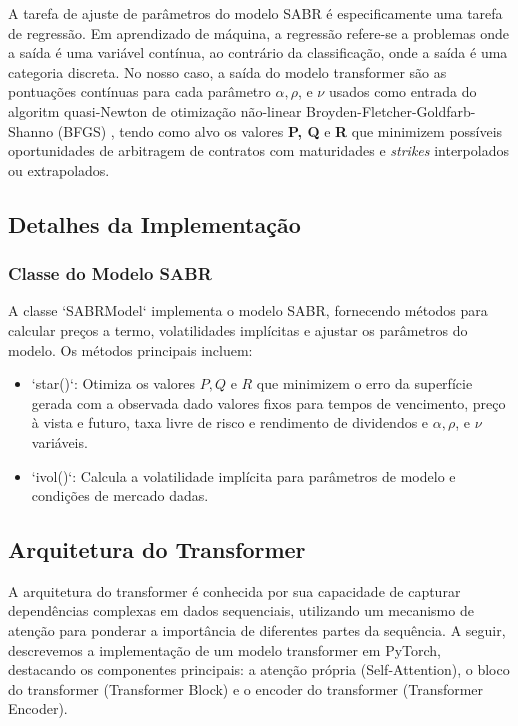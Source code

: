 A tarefa de ajuste de parâmetros do modelo SABR é especificamente uma tarefa de regressão. Em aprendizado de máquina, a regressão refere-se a problemas onde a saída é uma variável contínua, ao contrário da classificação, onde a saída é uma categoria discreta. No nosso caso, a saída do modelo transformer são as pontuações contínuas para cada parâmetro $\alpha, \rho$, e $\nu$ usados como entrada do algoritm quasi-Newton de otimização não-linear Broyden-Fletcher-Goldfarb-Shanno (BFGS) \citep{Broyden1970, Fletcher1970, Goldfarb1970, Shanno1970}, tendo como alvo os valores \textbf{P, Q} e \textbf{R} que minimizem possíveis oportunidades de arbitragem de contratos com maturidades e \textit{strikes} interpolados ou extrapolados.

\subsection{Detalhes da Implementação}

\subsubsection{Classe do Modelo SABR}

A classe `SABRModel` implementa o modelo SABR, fornecendo métodos para calcular preços a termo, volatilidades implícitas e ajustar os parâmetros do modelo. Os métodos principais incluem:
\begin{itemize}
	\item `star()`: Otimiza os valores $P, Q$ e $R$ que minimizem o erro da superfície gerada com a observada dado valores fixos para tempos de vencimento, preço à vista e futuro, taxa livre de risco e rendimento de dividendos e $\alpha, \rho$, e $\nu$ variáveis.
	\item `ivol()`: Calcula a volatilidade implícita para parâmetros de modelo e condições de mercado dadas.
\end{itemize}

\subsection{Arquitetura do Transformer}

A arquitetura do transformer é conhecida por sua capacidade de capturar dependências complexas em dados sequenciais, utilizando um mecanismo de atenção para ponderar a importância de diferentes partes da sequência. A seguir, descrevemos a implementação de um modelo transformer em PyTorch, destacando os componentes principais: a atenção própria (Self-Attention), o bloco do transformer (Transformer Block) e o encoder do transformer (Transformer Encoder).


